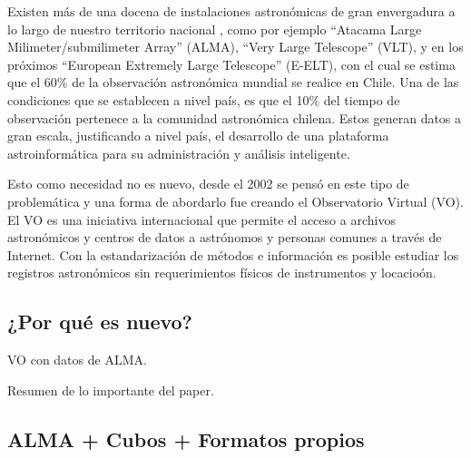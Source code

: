 Existen más de una docena de instalaciones astronómicas de gran envergadura a
lo largo de nuestro territorio nacional \cite{observatorios_chile}, como por
ejemplo ``Atacama Large Milimeter/submilimeter Array'' (ALMA), ``Very Large
Telescope'' (VLT), y en los próximos ``European Extremely Large Telescope''
(E-ELT), con el cual se estima que el 60\% de la observación astronómica
mundial se realice en Chile.  Una de las condiciones que se establecen a nivel
país, es que el 10\% del tiempo de observación pertenece a la comunidad
astronómica chilena. Estos generan datos a gran escala, justificando a nivel
país, el desarrollo de una plataforma astroinformática para su administración y
análisis inteligente.

Esto como necesidad no es nuevo, desde el 2002 se pensó en este tipo de problemática
y una forma de abordarlo fue creando el Observatorio Virtual (VO). El VO es una iniciativa 
internacional que permite el acceso a archivos astronómicos y centros 
de datos a astrónomos y personas comunes a través de Internet. Con la 
estandarización de métodos e información es posible estudiar los registros 
astronómicos sin requerimientos físicos de instrumentos y locacioón.

\subsection{¿Por qué es nuevo?}
VO con datos de ALMA.

Resumen de lo importante del paper.



\subsection{ALMA + Cubos + Formatos propios}
